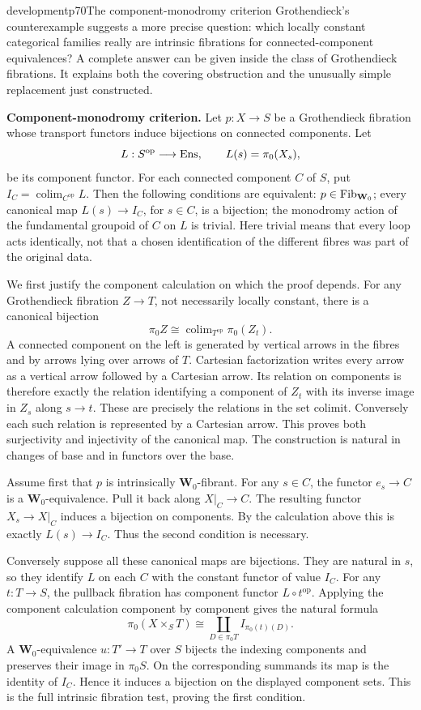 \begin{dcomment}{development}{p70}{The component-monodromy criterion}
Grothendieck's counterexample suggests a more precise question: which locally constant categorical families really are intrinsic fibrations for connected-component equivalences? A complete answer can be given inside the class of Grothendieck fibrations. It explains both the covering obstruction and the unusually simple replacement just constructed.

\textbf{Component-monodromy criterion.}\ours\quad
Let $p:X\to S$ be a Grothendieck fibration whose transport functors induce bijections on connected components. Let
\[
 L:S^{\mathrm{op}}\longrightarrow\mathrm{Ens},\qquad L(s)=\pi_0(X_s),
\]
be its component functor. For each connected component $C$ of $S$, put $I_C=\operatorname{colim}_{C^{\mathrm{op}}}L$. Then the following conditions are equivalent: $p\in\mathrm{Fib}_{\mathbf W_0}$; every canonical map $L(s)\to I_C$, for $s\in C$, is a bijection; the monodromy action of the fundamental groupoid of $C$ on $L$ is trivial. Here trivial means that every loop acts identically, not that a chosen identification of the different fibres was part of the original data.

We first justify the component calculation on which the proof depends. For any Grothendieck fibration $Z\to T$, not necessarily locally constant, there is a canonical bijection
\[
 \pi_0Z\cong\operatorname{colim}_{T^{\mathrm{op}}}\pi_0(Z_t).
\]
A connected component on the left is generated by vertical arrows in the fibres and by arrows lying over arrows of $T$. Cartesian factorization writes every arrow as a vertical arrow followed by a Cartesian arrow. Its relation on components is therefore exactly the relation identifying a component of $Z_t$ with its inverse image in $Z_s$ along $s\to t$. These are precisely the relations in the set colimit. Conversely each such relation is represented by a Cartesian arrow. This proves both surjectivity and injectivity of the canonical map. The construction is natural in changes of base and in functors over the base.

Assume first that $p$ is intrinsically $\mathbf W_0$-fibrant. For any $s\in C$, the functor $e_s\to C$ is a $\mathbf W_0$-equivalence. Pull it back along $X|_C\to C$. The resulting functor $X_s\to X|_C$ induces a bijection on components. By the calculation above this is exactly $L(s)\to I_C$. Thus the second condition is necessary.

Conversely suppose all these canonical maps are bijections. They are natural in $s$, so they identify $L$ on each $C$ with the constant functor of value $I_C$. For any $t:T\to S$, the pullback fibration has component functor $L\circ t^{\mathrm{op}}$. Applying the component calculation component by component gives the natural formula
\[
 \pi_0(X\times_ST)
 \cong\coprod_{D\in\pi_0T} I_{\pi_0(t)(D)}.
\]
A $\mathbf W_0$-equivalence $u:T'\to T$ over $S$ bijects the indexing components and preserves their image in $\pi_0S$. On the corresponding summands its map is the identity of $I_C$. Hence it induces a bijection on the displayed component sets. This is the full intrinsic fibration test, proving the first condition.


\end{dcomment}
